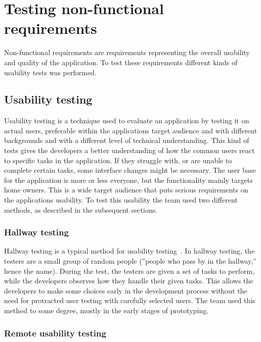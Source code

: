 \section{Testing non-functional requirements}
\label{sec:testingnonfunctionalrequirements}
Non-functional requirements are requirements representing the overall usability and quality of the application. To test these requirements different kinds of usability tests was performed.

\subsection{Usability testing}
\label{sec:userTest}

Usability testing is a technique used to evaluate an application by testing it on actual users, preferable within the applications target audience and with different backgrounds and with a different level of technical understanding. This kind of tests gives the developers a better understanding of how the common users react to specific tasks in the application. If they struggle with, or are unable to complete certain tasks, some interface changes might be necessary.
The user base for the application is more or less everyone, but the functionality mainly targets home owners. This is a wide target audience that puts serious requirements on the applications usability. To test this usability the team used two different methods, as described in the subsequent sections.

\subsubsection{Hallway testing}
Hallway testing is a typical method for usability testing~\cite{hallwaytesting}. In hallway testing, the testers are a small group of random people (''people who pass by in the hallway,'' hence the name). During the test, the testers are given a set of tasks to perform, while the developers observes how they handle their given tasks. This allows the developers to make some choices early in the development process without the need for protracted user testing with carefully selected users. 
The team used this method to some degree, mostly in the early stages of prototyping.

\subsubsection{Remote usability testing}

